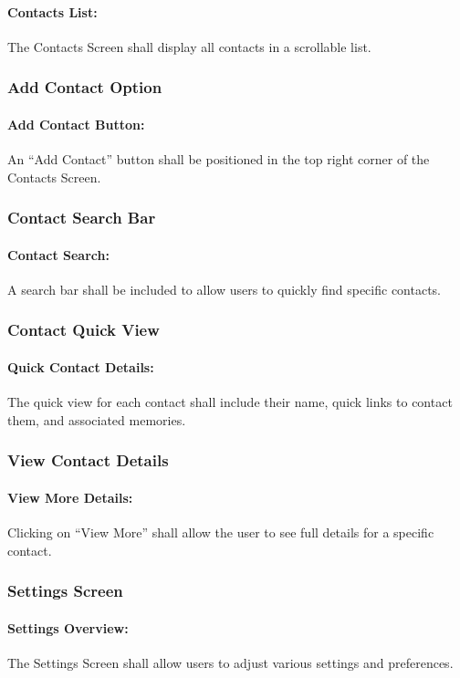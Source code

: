\documentclass{article}
\begin{document}
\paragraph{Contacts List:} The Contacts Screen shall display all contacts in a scrollable list.
\subsubsection*{Add Contact Option}
\addtocounter{subsubsection}{1}
\paragraph{Add Contact Button:} An “Add Contact” button shall be positioned in the top right corner of the Contacts Screen.
\subsubsection*{Contact Search Bar}
\addtocounter{subsubsection}{1}
\paragraph{Contact Search:} A search bar shall be included to allow users to quickly find specific contacts.
\subsubsection*{Contact Quick View}
\addtocounter{subsubsection}{1}
\paragraph{Quick Contact Details:} The quick view for each contact shall include their name, quick links to contact them, and associated memories.
\subsubsection*{View Contact Details}
\addtocounter{subsubsection}{1}
\paragraph{View More Details:} Clicking on “View More” shall allow the user to see full details for a specific contact.
\subsubsection*{Settings Screen}
\addtocounter{subsubsection}{1}
\paragraph{Settings Overview:} The Settings Screen shall allow users to adjust various settings and preferences.
\end{document}
